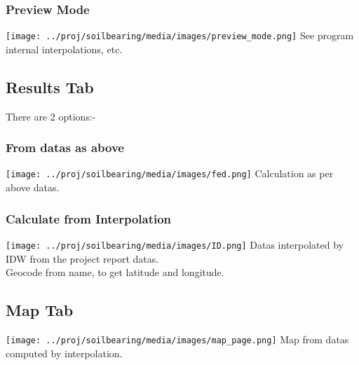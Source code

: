 \subsubsection{Preview Mode}
\texttt{[image: ../proj/soilbearing/media/images/preview\_mode.png]}
See program internal interpolations, etc. \\

\subsection{Results Tab}
There are 2 options:-\\
\subsubsection{From datas as above}
\texttt{[image: ../proj/soilbearing/media/images/fed.png]}
Calculation as per above datas.\\

\subsubsection{Calculate from Interpolation}
\texttt{[image: ../proj/soilbearing/media/images/ID.png]}
Datas interpolated by IDW from the project report datas.\\
Geocode from name, to get latitude and longitude.\\

\subsection{Map Tab}
\texttt{[image: ../proj/soilbearing/media/images/map\_page.png]}
Map from datas computed by interpolation.